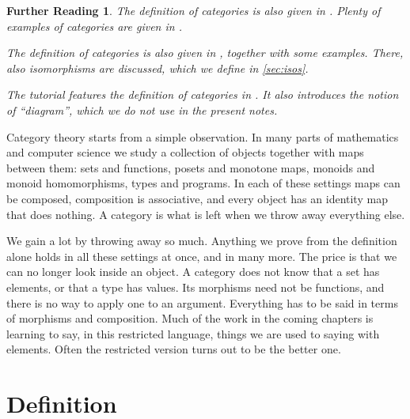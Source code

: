 \documentclass[a4paper,11pt, oneside,titlepage=false]{scrbook}
\theoremstyle{plain}
\newtheorem*{reading*}{Further Reading}
\theoremstyle{definition}
\begin{document}
\begin{reading*}
The definition of categories is also given in \cite[\S 2.1]{barr-wells}. Plenty of examples of categories are given in \cite[\S\S 2.3--2.5]{barr-wells}.

  The definition of categories is also given in \cite[\S 1.1]{leinster}, together with some examples.
  There, also isomorphisms are discussed, which we define in \cref{sec:isos}.

  The tutorial \cite{pierce} features the definition of categories in \cite[\S 2.1]{pierce}.
  It also introduces the notion of ``diagram'', which we do not use in the present notes.
\end{reading*}

Category theory starts from a simple observation.
In many parts of mathematics and computer science we study a collection of
objects together with maps between them: sets and functions, posets and
monotone maps, monoids and monoid homomorphisms, types and programs.
In each of these settings maps can be composed, composition is associative, and
every object has an identity map that does nothing.
A category is what is left when we throw away everything else.

We gain a lot by throwing away so much.
Anything we prove from the definition alone holds in all these settings at
once, and in many more.
The price is that we can no longer look inside an object.
A category does not know that a set has elements, or that a type has values.
Its morphisms need not be functions, and there is no way to apply one to an
argument.
Everything has to be said in terms of morphisms and composition.
Much of the work in the coming chapters is learning to say, in this restricted
language, things we are used to saying with elements.
Often the restricted version turns out to be the better one.

\section{Definition}
\end{document}
